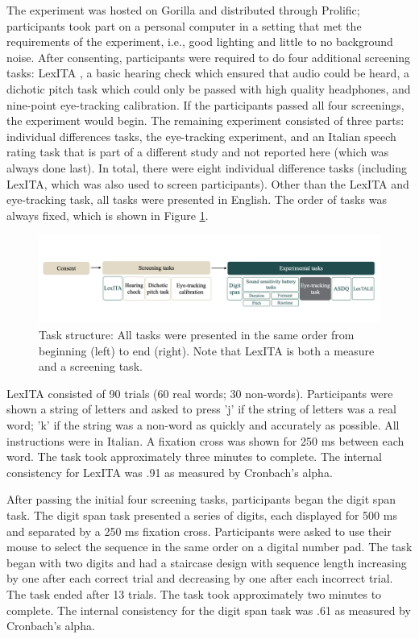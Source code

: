 The experiment was hosted on Gorilla and distributed through Prolific; participants took part on a personal computer in a setting that met the requirements of the experiment, i.e., good lighting and little to no background noise. After consenting, participants were required to do four additional screening tasks: LexITA \cite{Amenta2021}, a basic hearing check which ensured that audio could be heard, a dichotic pitch task \citep{milne_2021} which could only be passed with high quality headphones, and nine-point eye-tracking calibration. If the participants passed all four screenings, the experiment would begin. The remaining experiment consisted of three parts: individual differences tasks, the eye-tracking experiment, and an Italian speech rating task that is part of a different study and not reported here (which was always done last). In total, there were eight individual difference tasks (including LexITA, which was also used to screen participants). Other than the LexITA and eye-tracking task, all tasks were presented in English. The order of tasks was always fixed, which is shown in Figure \ref{fig:task_structure}. 

\begin{figure}[H]
  \centering
  \includegraphics[width=1\linewidth]{visuals/task_structure.jpg}
  \caption{Task structure: All tasks were presented in the same order from beginning (left) to end (right). Note that LexITA is both a measure and a screening task.}
  \label{fig:task_structure}
\end{figure}

LexITA \citep{Amenta2021} consisted of 90 trials (60 real words; 30 non-words). Participants were shown a string of letters and asked to press 'j' if the string of letters was a real word; 'k' if the string was a non-word as quickly and accurately as possible. All instructions were in Italian. A fixation cross was shown for 250 ms between each word. The task took approximately three minutes to complete. The internal consistency for LexITA was .91 as measured by Cronbach's alpha.

After passing the initial four screening tasks, participants began the digit span task. The digit span task presented a series of digits, each displayed for 500 ms and separated by a 250 ms fixation cross. Participants were asked to use their mouse to select the sequence in the same order on a digital number pad. The task began with two digits and had a staircase design with sequence length increasing by one after each correct trial and decreasing by one after each incorrect trial. The task ended after 13 trials. The task took approximately two minutes to complete. The internal consistency for the digit span task was .61 as measured by Cronbach's alpha.

